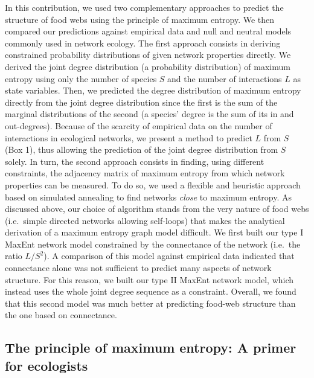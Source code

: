 \documentclass[11pt]{article}
\begin{document}
In this contribution, we used two complementary approaches to predict
the structure of food webs using the principle of maximum entropy. We
then compared our predictions against empirical data and null and
neutral models commonly used in network ecology. The first approach
consists in deriving constrained probability distributions of given
network properties directly. We derived the joint degree distribution (a
probability distribution) of maximum entropy using only the number of
species \(S\) and the number of interactions \(L\) as state variables.
Then, we predicted the degree distribution of maximum entropy directly
from the joint degree distribution since the first is the sum of the
marginal distributions of the second (a species' degree is the sum of
its in and out-degrees). Because of the scarcity of empirical data on
the number of interactions in ecological networks, we present a method
to predict \(L\) from \(S\) (Box 1), thus allowing the prediction of the
joint degree distribution from \(S\) solely. In turn, the second
approach consists in finding, using different constraints, the adjacency
matrix of maximum entropy from which network properties can be measured.
To do so, we used a flexible and heuristic approach based on simulated
annealing to find networks \emph{close} to maximum entropy. As discussed
above, our choice of algorithm stands from the very nature of food webs
(i.e.~simple directed networks allowing self-loops) that makes the
analytical derivation of a maximum entropy graph model difficult. We
first built our type I MaxEnt network model constrained by the
connectance of the network (i.e.~the ratio \(L/S^2\)). A comparison of
this model against empirical data indicated that connectance alone was
not sufficient to predict many aspects of network structure. For this
reason, we built our type II MaxEnt network model, which instead uses
the whole joint degree sequence as a constraint. Overall, we found that
this second model was much better at predicting food-web structure than
the one based on connectance.

\hypertarget{the-principle-of-maximum-entropy-a-primer-for-ecologists}{%
\subsection{The principle of maximum entropy: A primer for
ecologists}\label{the-principle-of-maximum-entropy-a-primer-for-ecologists}}
\end{document}
